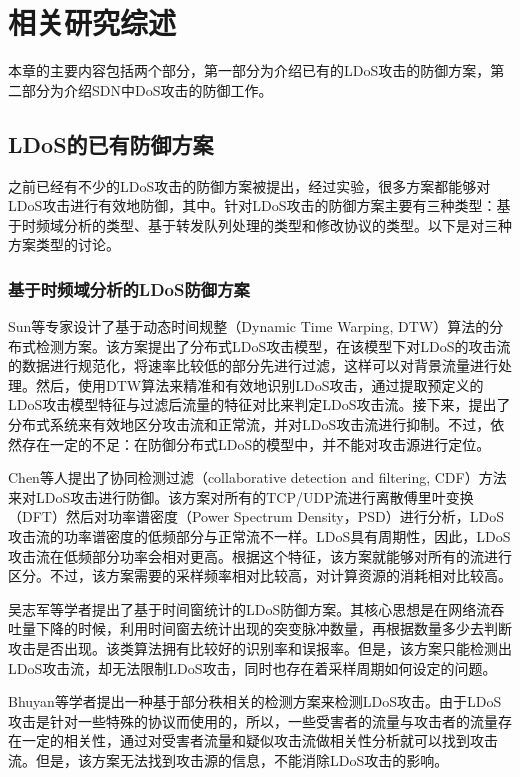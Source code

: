 \chapter{相关研究综述}
\label{cha:relatedWork}

本章的主要内容包括两个部分，第一部分为介绍已有的LDoS攻击的防御方案，第二部分为介绍SDN中DoS攻击的防御工作。

\section{LDoS的已有防御方案}
\label{chap2:LDoSwork}
之前已经有不少的LDoS攻击的防御方案被提出，经过实验，很多方案都能够对LDoS攻击进行有效地防御，其中。针对LDoS攻击的防御方案主要有三种类型：基于时频域分析的类型、基于转发队列处理的类型和修改协议的类型。以下是对三种方案类型的讨论。


\subsection{基于时频域分析的LDoS防御方案}
\label{chap2:TFanalysis}

Sun\cite{b4}等专家设计了基于动态时间规整（Dynamic Time Warping, DTW）算法的分布式检测方案。该方案提出了分布式LDoS攻击模型，在该模型下对LDoS的攻击流的数据进行规范化，将速率比较低的部分先进行过滤，这样可以对背景流量进行处理。然后，使用DTW算法来精准和有效地识别LDoS攻击，通过提取预定义的LDoS攻击模型特征与过滤后流量的特征对比来判定LDoS攻击流。接下来，提出了分布式系统来有效地区分攻击流和正常流，并对LDoS攻击流进行抑制。不过，依然存在一定的不足：在防御分布式LDoS的模型中，并不能对攻击源进行定位。

Chen\cite{b7}等人提出了协同检测过滤（collaborative detection and filtering, CDF）方法来对LDoS攻击进行防御。该方案对所有的TCP/UDP流进行离散傅里叶变换（DFT）然后对功率谱密度（Power Spectrum Density，PSD）进行分析，LDoS攻击流的功率谱密度的低频部分与正常流不一样。LDoS具有周期性，因此，LDoS攻击流在低频部分功率会相对更高。根据这个特征，该方案就能够对所有的流进行区分。不过，该方案需要的采样频率相对比较高，对计算资源的消耗相对比较高。

吴志军\cite{wuLDoSdetect}等学者提出了基于时间窗统计的LDoS防御方案。其核心思想是在网络流吞吐量下降的时候，利用时间窗去统计出现的突变脉冲数量，再根据数量多少去判断攻击是否出现。该类算法拥有比较好的识别率和误报率。但是，该方案只能检测出LDoS攻击流，却无法限制LDoS攻击，同时也存在着采样周期如何设定的问题。

Bhuyan\cite{bhuyan2015low}等学者提出一种基于部分秩相关的检测方案来检测LDoS攻击。由于LDoS攻击是针对一些特殊的协议而使用的，所以，一些受害者的流量与攻击者的流量存在一定的相关性，通过对受害者流量和疑似攻击流做相关性分析就可以找到攻击流。但是，该方案无法找到攻击源的信息，不能消除LDoS攻击的影响。

